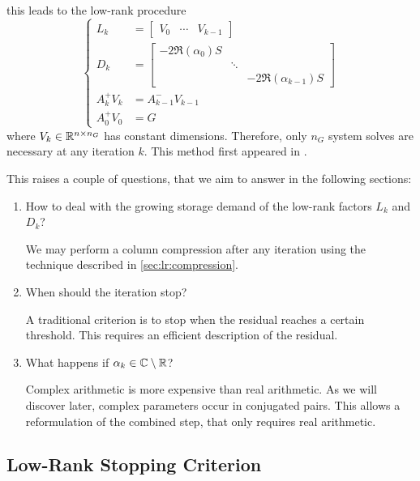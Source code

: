 this leads to the low-rank procedure
\begin{equation}
\label{eq:adi:si-lr-adi}
\left\{
\begin{aligned}
  L_k &= \begin{bmatrix}
    V_0 &
    \cdots &
    V_{k-1}
  \end{bmatrix} \\
  D_k &= \begin{bmatrix}
    -2 \Re(\alpha_0) S \\
    & \ddots \\
    && -2 \Re(\alpha_{k-1}) S
  \end{bmatrix} \\
  A_k^+ V_k &= A_{k-1}^- V_{k-1} \\
  A_0^+ V_0 &= G
\end{aligned}
\right.
\end{equation}
where $V_k \in\mathbb{R}^{n\times n_G}$ has constant dimensions.
Therefore, only $n_G$ system solves are necessary at any iteration $k$.
This method first appeared in \cite[Section~5]{Benner2009}.

This raises a couple of questions,
that we aim to answer in the following sections:
\begin{enumerate}
  \item
    How to deal with the growing storage demand of the low-rank factors $L_k$ and $D_k$?

    We may perform a column compression after any iteration using the technique described in \autoref{sec:lr:compression}.
  \item
    When should the iteration stop?

    A traditional criterion is to stop when the residual reaches a certain threshold.
    This requires an efficient description of the residual.
  \item
    What happens if $\alpha_k\in\mathbb{C}\setminus\mathbb{R}$?

    Complex arithmetic is more expensive than real arithmetic.
    As we will discover later, complex parameters occur in conjugated pairs.
    This allows a reformulation of the combined step,
    that only requires real arithmetic.
\end{enumerate}

\subsection{Low-Rank Stopping Criterion}

